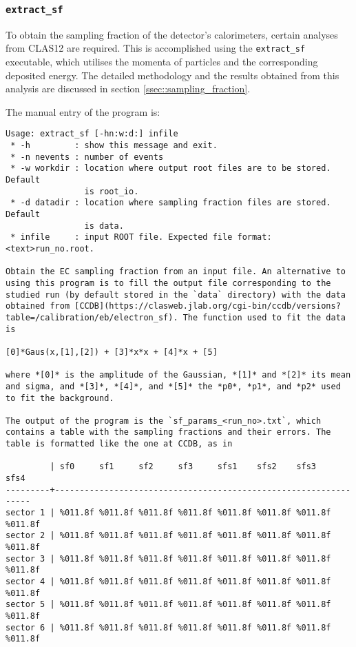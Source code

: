 \subsubsection{\texttt{extract\_sf}}
\label{sssec::extract_sf}
    To obtain the sampling fraction of the detector's calorimeters, certain analyses from CLAS12 are required.
    This is accomplished using the \texttt{extract\_sf} executable, which utilises the momenta of particles and the corresponding deposited energy.
    The detailed methodology and the results obtained from this analysis are discussed in section \ref{ssec::sampling_fraction}.

    The manual entry of the program is:
    \begin{lstlisting}
Usage: extract_sf [-hn:w:d:] infile
 * -h         : show this message and exit.
 * -n nevents : number of events
 * -w workdir : location where output root files are to be stored. Default
                is root_io.
 * -d datadir : location where sampling fraction files are stored. Default
                is data.
 * infile     : input ROOT file. Expected file format: <text>run_no.root.

Obtain the EC sampling fraction from an input file. An alternative to using this program is to fill the output file corresponding to the studied run (by default stored in the `data` directory) with the data obtained from [CCDB](https://clasweb.jlab.org/cgi-bin/ccdb/versions?table=/calibration/eb/electron_sf). The function used to fit the data is

[0]*Gaus(x,[1],[2]) + [3]*x*x + [4]*x + [5]

where *[0]* is the amplitude of the Gaussian, *[1]* and *[2]* its mean and sigma, and *[3]*, *[4]*, and *[5]* the *p0*, *p1*, and *p2* used to fit the background.

The output of the program is the `sf_params_<run_no>.txt`, which contains a table with the sampling fractions and their errors. The table is formatted like the one at CCDB, as in

         | sf0     sf1     sf2     sf3     sfs1    sfs2    sfs3    sfs4
---------+-----------------------------------------------------------------
sector 1 | %011.8f %011.8f %011.8f %011.8f %011.8f %011.8f %011.8f %011.8f
sector 2 | %011.8f %011.8f %011.8f %011.8f %011.8f %011.8f %011.8f %011.8f
sector 3 | %011.8f %011.8f %011.8f %011.8f %011.8f %011.8f %011.8f %011.8f
sector 4 | %011.8f %011.8f %011.8f %011.8f %011.8f %011.8f %011.8f %011.8f
sector 5 | %011.8f %011.8f %011.8f %011.8f %011.8f %011.8f %011.8f %011.8f
sector 6 | %011.8f %011.8f %011.8f %011.8f %011.8f %011.8f %011.8f %011.8f
    \end{lstlisting}
